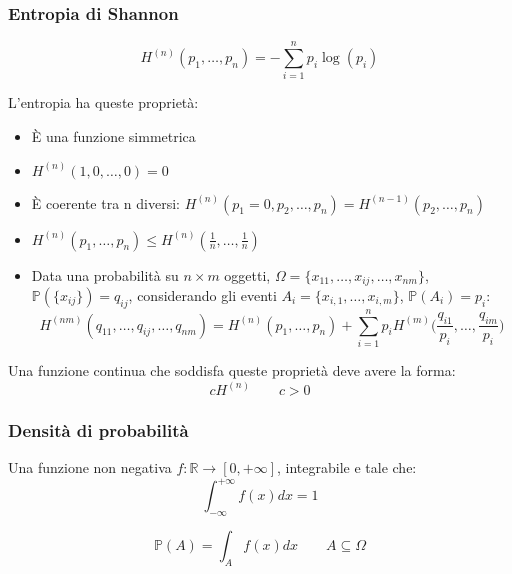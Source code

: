 \subsubsection{Entropia di Shannon}
\begin{definition}[Entropia]
	\begin{equation}
		H^{(n)}(p_1, \ldots, p_n) = - \sum_{i=1}^{n} p_i \log(p_i)
	\end{equation}
\end{definition}
\begin{proposition}
	L'entropia ha queste proprietà:
	\begin{itemize}
		\item È una funzione simmetrica
		\item $H^{(n)}(1, 0, \ldots, 0) = 0$
		\item È coerente tra n diversi: $H^{(n)}(p_1=0,p_2, \ldots, p_n) = H^{(n-1)}(p_2, \ldots, p_n) $
		\item $H^{(n)}(p_1, \ldots, p_n) \leq H^{(n)}(\frac{1}{n}, \ldots, \frac{1}{n})$
		\item Data una probabilità su $n \times m$ oggetti, $\Omega = \{x_{11}, \ldots, x_{ij}, \ldots, x_{nm}\}$, $\mathbb{P}(\{x_{ij}\})=q_{ij}$, considerando gli eventi $A_i = \{x_{i,1}, \ldots, x_{i,m}\}$, $\mathbb{P}(A_i)=p_i$:
		\begin{equation}
			H^{(nm)}(q_{11}, \ldots, q_{ij}, \ldots, q_{nm}) = H^{(n)}(p_1, \ldots, p_n) + \sum_{i=1}^{n} p_i H^{(m)}\bigg(\frac{q_{i1}}{p_i}, \ldots, \frac{q_{im}}{p_i}\bigg)
		\end{equation}
	\end{itemize}
\end{proposition}

\begin{theorem}
	Una funzione continua che soddisfa queste proprietà deve avere la forma:
	\begin{equation}
		cH^{(n)} \quad\quad c>0
	\end{equation}
\end{theorem}

\subsubsection{Densità di probabilità}
\begin{definition}
	Una funzione non negativa $f : \mathbb{R} \to [0, +\infty]$, integrabile e tale che:
	\begin{equation*}
		\int_{-\infty}^{+\infty}f(x)dx = 1
	\end{equation*}
\end{definition}
\begin{definition}
	\begin{equation}
		\mathbb{P}(A) = \int_{A} f(x)dx \quad\quad A \subseteq \Omega
	\end{equation}
\end{definition}

